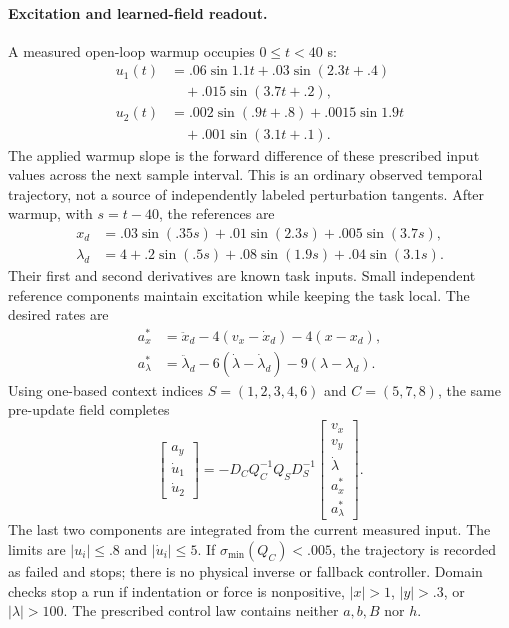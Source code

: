 \documentclass[journal]{IEEEtran}
\begin{document}
\paragraph{Excitation and learned-field readout.}
A measured open-loop warmup occupies $0\le t<40$ s:
\begin{align}
 u_1(t)&=.06\sin1.1t+.03\sin(2.3t+.4)\nonumber\\
       &\quad+.015\sin(3.7t+.2),\nonumber\\
 u_2(t)&=.002\sin(.9t+.8)+.0015\sin1.9t\nonumber\\
       &\quad+.001\sin(3.1t+.1).
 \label{eq:direct_contact_probe}
\end{align}
The applied warmup slope is the forward difference of these prescribed input
values across the next sample interval. This is an ordinary observed temporal
trajectory, not a source of independently labeled perturbation tangents.
After warmup, with $s=t-40$, the references are
\begin{align}
 x_d&=.03\sin(.35s)+.01\sin(2.3s)+.005\sin(3.7s),\nonumber\\
 \lambda_d&=4+.2\sin(.5s)+.08\sin(1.9s)+.04\sin(3.1s).
 \label{eq:direct_contact_reference}
\end{align}
Their first and second derivatives are known task inputs. Small independent
reference components maintain excitation while keeping the task local.
The desired rates are
\begin{align}
 a_x^*&=\ddot x_d-4(v_x-\dot x_d)-4(x-x_d),\nonumber\\
 a_\lambda^*&=\ddot\lambda_d-6(\dot\lambda-\dot\lambda_d)
                         -9(\lambda-\lambda_d).
 \label{eq:direct_contact_feedback}
\end{align}
Using one-based context indices $S=(1,2,3,4,6)$ and $C=(5,7,8)$, the same
pre-update field completes
\begin{equation}
 \begin{bmatrix}a_y\\\dot u_1\\\dot u_2\end{bmatrix}
 =-D_CQ_C^{-1}Q_SD_S^{-1}
 \begin{bmatrix}v_x\\v_y\\\dot\lambda\\a_x^*\\a_\lambda^*\end{bmatrix}.
 \label{eq:direct_contact_completion}
\end{equation}
The last two components are integrated from the current measured input.
The limits are $|u_i|\le.8$ and $|\dot u_i|\le5$.
If $\sigma_{\min}(Q_C)<.005$, the trajectory is recorded as failed and stops;
there is no physical inverse or fallback controller. Domain checks stop a run
if indentation or force is nonpositive, $|x|>1$, $|y|>.3$, or $|\lambda|>100$.
The prescribed control law contains neither $a,b,B$ nor $h$.
\end{document}
